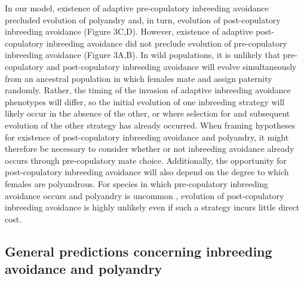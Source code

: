 \documentclass[10pt,letterpaper]{article}
\begin{document}
In our model, existence of adaptive pre-copulatory inbreeding avoidance precluded evolution of polyandry and, in turn, evolution of post-copulatory inbreeding avoidance (Figure 3C,D). However, existence of adaptive post-copulatory inbreeding avoidance did not preclude evolution of pre-copulatory inbreeding avoidance (Figure 3A,B). In wild populations, it is unlikely that pre-copulatory and post-copulatory inbreeding avoidance will evolve simultaneously from an ancestral population in which females mate and assign paternity randomly. Rather, the timing of the invasion of adaptive inbreeding avoidance phenotypes will differ, so the initial evolution of one inbreeding strategy will likely occur in the absence of the other, or where selection for and subsequent evolution of the other strategy has already occurred. When framing hypotheses for existence of post-copulatory inbreeding avoidance and polyandry, it might therefore be necessary to consider whether or not inbreeding avoidance already occurs through pre-copulatory mate choice. Additionally, the opportunity for post-copulatory inbreeding avoidance will also depend on the degree to which females are polyandrous. For species in which pre-copulatory inbreeding avoidance occurs and polyandry is uncommon \cite[][]{Lihoreau2007, Metzger2010, Metzger2010a}, evolution of post-copulatory inbreeding avoidance is highly unlikely even if such a strategy incurs little direct cost. 


\subsection*{General predictions concerning inbreeding avoidance and polyandry}
\end{document}
